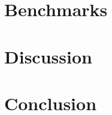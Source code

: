 \documentclass[a4paper]{article}
\begin{document}
\section{Benchmarks}
\label{sec:org7566124}

\section{Discussion}
\label{sec:orgd5bf5d7}

\section{Conclusion}
\label{sec:org97c6992}




\begin{appendix}

\end{appendix}
\end{document}
